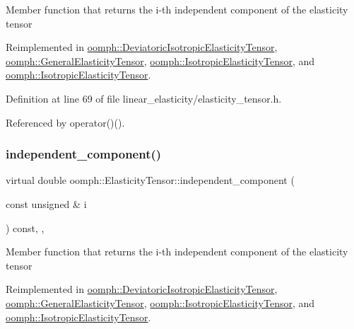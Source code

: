 Member function that returns the i-\/th independent component of the elasticity tensor 

Reimplemented in \hyperlink{classoomph_1_1DeviatoricIsotropicElasticityTensor_ab9861d265cbc24c5fa6b55f0613ead8b}{oomph\+::\+Deviatoric\+Isotropic\+Elasticity\+Tensor}, \hyperlink{classoomph_1_1GeneralElasticityTensor_a01443522709af3e2f1af63411be4f0e6}{oomph\+::\+General\+Elasticity\+Tensor}, \hyperlink{classoomph_1_1IsotropicElasticityTensor_a6b4a91ef7585590886cd191a7c03827d}{oomph\+::\+Isotropic\+Elasticity\+Tensor}, and \hyperlink{classoomph_1_1IsotropicElasticityTensor_a6b4a91ef7585590886cd191a7c03827d}{oomph\+::\+Isotropic\+Elasticity\+Tensor}.



Definition at line 69 of file linear\+\_\+elasticity/elasticity\+\_\+tensor.\+h.



Referenced by operator()().

\mbox{\label{classoomph_1_1ElasticityTensor_a84b2a9b7a447cf88b2d6b98b5e6e7bd5}} 
\subsubsection{\texorpdfstring{independent\+\_\+component()}{independent\_component()}\hspace{0.1cm}{\footnotesize\ttfamily [2/2]}}
{\footnotesize\ttfamily virtual double oomph\+::\+Elasticity\+Tensor\+::independent\+\_\+component (\begin{DoxyParamCaption}\item[{const unsigned \&}]{i }\end{DoxyParamCaption}) const\hspace{0.3cm}{\ttfamily [inline]}, {\ttfamily [protected]}, {\ttfamily [virtual]}}

Member function that returns the i-\/th independent component of the elasticity tensor 

Reimplemented in \hyperlink{classoomph_1_1DeviatoricIsotropicElasticityTensor_ab9861d265cbc24c5fa6b55f0613ead8b}{oomph\+::\+Deviatoric\+Isotropic\+Elasticity\+Tensor}, \hyperlink{classoomph_1_1GeneralElasticityTensor_a01443522709af3e2f1af63411be4f0e6}{oomph\+::\+General\+Elasticity\+Tensor}, \hyperlink{classoomph_1_1IsotropicElasticityTensor_a6b4a91ef7585590886cd191a7c03827d}{oomph\+::\+Isotropic\+Elasticity\+Tensor}, and \hyperlink{classoomph_1_1IsotropicElasticityTensor_a6b4a91ef7585590886cd191a7c03827d}{oomph\+::\+Isotropic\+Elasticity\+Tensor}.



